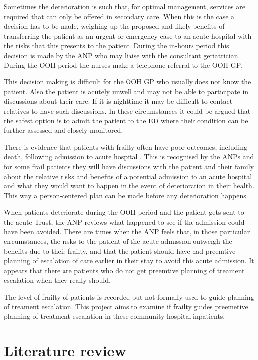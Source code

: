 \documentclass
[
	12pt,
	a4paper,
	oneside,
]{article}
\begin{document}
Sometimes the deterioration is such that, 
for optimal management, services are required that can only be offered in secondary 
care. When this is the case a decision has to be made, weighing up the proposed
and likely benefits of transferring the patient as an urgent or emergency case to
an acute hospital with the risks that this presents to the patient. During the in-hours
period this decision is made by the ANP who may liaise with the consultant geriatrician. During
the OOH period the nurses make a telephone referral to the OOH GP.

This decision making is difficult for the OOH GP who usually does not know the patient.
Also the patient is acutely unwell and may not be able to participate in discussions
about their care. If it is nighttime it may be difficult to contact relatives to 
have such discussions. In these circumstances it could
be argued that the safest option is to admit the patient to the ED where their 
condition can be further assessed and closely monitored.

There is evidence that patients with frailty often have poor outcomes, including death,
following admission to acute hospital \parencite{silver:12, wallis:15}. 
This is recognised by the ANPs and for some frail patients they 
will have discussions with the patient and their family about the relative risks
and benefits of a potential admission to an acute hospital and what they would want to 
happen in the event of deterioration in their health. This way a person-centered 
plan can be made before any deterioration happens.

When patients deteriorate during the OOH period and the patient
gets sent to the acute Trust, the ANP reviews what happened to see if the admission
could have been avoided. There are times when the ANP feels that, in those particular
circumstances, the risks to the patient of the acute admission outweigh the benefits
due to their frailty, and that the patient should have had preemtive planning of 
escalation of care earlier in their stay to avoid this acute admission. It appears 
that there are patients who do not get preemtive planning of treament escalation
when they really should.

The level of frailty of patients is recorded but not formally used to guide planning of
treament escalation. This project aims to examine if frailty guides preemetive
planning of treatment escalation in these community hospital inpatients.

\section{Literature review}
\end{document}
